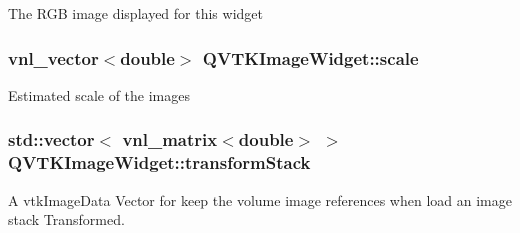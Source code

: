 The R\-G\-B image displayed for this widget \hypertarget{class_q_v_t_k_image_widget_a9c5324e5b044bf1e55f3205002d69da0}{
\subsubsection[{scale}]{\setlength{\rightskip}{0pt plus 5cm}vnl\-\_\-vector$<$double$>$ {\bf Q\-V\-T\-K\-Image\-Widget\-::scale}}}\label{d8/dd7/class_q_v_t_k_image_widget_a9c5324e5b044bf1e55f3205002d69da0}
Estimated scale of the images \hypertarget{class_q_v_t_k_image_widget_a39502e633f132da83233e9cbb1306196}{
\subsubsection[{transform\-Stack}]{\setlength{\rightskip}{0pt plus 5cm}std\-::vector$<$ vnl\-\_\-matrix$<$double$>$ $>$ {\bf Q\-V\-T\-K\-Image\-Widget\-::transform\-Stack}}}\label{d8/dd7/class_q_v_t_k_image_widget_a39502e633f132da83233e9cbb1306196}


A vtk\-Image\-Data Vector for keep the volume image references when load an image stack Transformed. 

